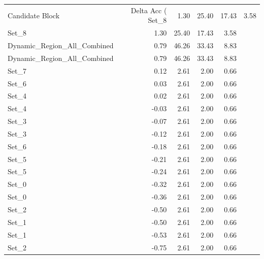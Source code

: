 \begin{tabular}{lrrrr}
\toprule
Candidate Block & Delta Acc (%
\midrule
Set_8 & 1.30 & 25.40 & 17.43 & 3.58 \\
Set_8 & 1.30 & 25.40 & 17.43 & 3.58 \\
Dynamic_Region_All_Combined & 0.79 & 46.26 & 33.43 & 8.83 \\
Dynamic_Region_All_Combined & 0.79 & 46.26 & 33.43 & 8.83 \\
Set_7 & 0.12 & 2.61 & 2.00 & 0.66 \\
Set_6 & 0.03 & 2.61 & 2.00 & 0.66 \\
Set_4 & 0.02 & 2.61 & 2.00 & 0.66 \\
Set_4 & -0.03 & 2.61 & 2.00 & 0.66 \\
Set_3 & -0.07 & 2.61 & 2.00 & 0.66 \\
Set_3 & -0.12 & 2.61 & 2.00 & 0.66 \\
Set_6 & -0.18 & 2.61 & 2.00 & 0.66 \\
Set_5 & -0.21 & 2.61 & 2.00 & 0.66 \\
Set_5 & -0.24 & 2.61 & 2.00 & 0.66 \\
Set_0 & -0.32 & 2.61 & 2.00 & 0.66 \\
Set_0 & -0.36 & 2.61 & 2.00 & 0.66 \\
Set_2 & -0.50 & 2.61 & 2.00 & 0.66 \\
Set_1 & -0.50 & 2.61 & 2.00 & 0.66 \\
Set_1 & -0.53 & 2.61 & 2.00 & 0.66 \\
Set_2 & -0.75 & 2.61 & 2.00 & 0.66 \\
\bottomrule
\end{tabular}
